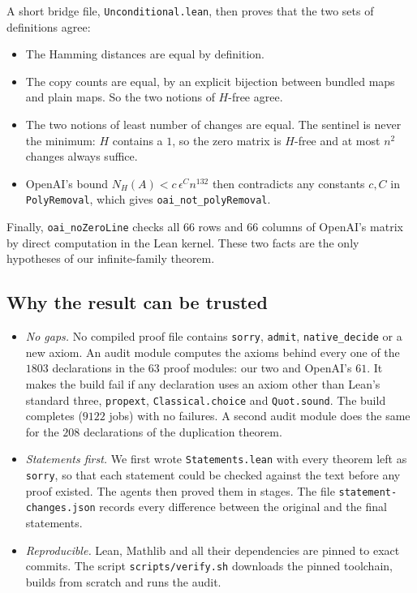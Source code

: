 \documentclass{article}
\theoremstyle{plain}
\theoremstyle{definition}
\begin{document}
A short bridge file, \texttt{Unconditional.lean}, then proves that the two
sets of definitions agree:
\begin{itemize}\itemsep1pt
\item The Hamming distances are equal by definition.
\item The copy counts are equal, by an explicit bijection between bundled maps
  and plain maps. So the two notions of $H$-free agree.
\item The two notions of least number of changes are equal. The sentinel is
  never the minimum: $H$ contains a $1$, so the zero matrix is $H$-free and
  at most $n^2$ changes always suffice.
\item OpenAI's bound $N_H(A)<c\,\epsilon^C n^{132}$ then contradicts any
  constants $c,C$ in \texttt{PolyRemoval}, which gives
  \texttt{oai\_not\_polyRemoval}.
\end{itemize}
Finally, \texttt{oai\_noZeroLine} checks all $66$ rows and $66$ columns of
OpenAI's matrix by direct computation in the Lean kernel. These two facts are
the only hypotheses of our infinite-family theorem.

\subsection*{Why the result can be trusted}

\begin{itemize}
\item \emph{No gaps.} No compiled proof file contains \texttt{sorry},
  \texttt{admit}, \texttt{native\_decide} or a new axiom. An audit module
  computes the axioms behind every one of the $1803$ declarations in the
  $63$ proof modules: our two and OpenAI's $61$. It makes the build fail if
  any declaration uses an axiom other than Lean's standard three,
  \texttt{propext}, \texttt{Classical.choice} and \texttt{Quot.sound}. The
  build completes ($9122$ jobs) with no failures. A second audit module does
the same for the $208$ declarations of the duplication theorem.
\item \emph{Statements first.} We first wrote \texttt{Statements.lean} with
  every theorem left as \texttt{sorry}, so that each statement could be checked
  against the text before any proof existed. The agents then proved them in
  stages. The
  file \texttt{statement-changes.json} records every difference between the
  original and the final statements.
\item \emph{Reproducible.} Lean, Mathlib and all their dependencies are pinned
  to exact commits. The script \texttt{scripts/verify.sh} downloads the pinned
  toolchain, builds from scratch and runs the audit.
\end{itemize}
\end{document}
